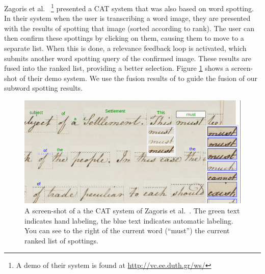 \documentclass[ms,electronic,twosidetoc,letterpaper,chaptercenter,parttop,lol,lof,lot]{byumsphd}
\begin{document}
Zagoris et al.~\cite{Zagoris2015} \footnote{A demo of their system is found at \url{http://vc.ee.duth.gr/ws/}} presented a CAT system that was also based on word spotting. In their system when the user is transcribing a word image, they are presented with the results of spotting that image (sorted according to rank). The user can then confirm these spottings by clicking on them, causing them to move to a separate list. When this is done, a relevance feedback loop is activated, which submits another word spotting query of the confirmed image. These results are fused into the ranked list, providing a better selection. Figure \ref{fig:zagoris} shows a screen-shot of their demo system.
We use the fusion results of \cite{Zagoris2015} to guide the fusion of our subword spotting results.

\begin{figure}
    \centering
    \includegraphics[width=.9\textwidth]{zagoris}
    \caption{A screen-shot of a the CAT system of Zagoris et al.~\cite{Zagoris2015}. The green text indicates hand labeling, the blue text indicates automatic labeling. You can see to the right of the current word (``must'') the current ranked list of spottings.}
    \label{fig:zagoris}
\end{figure}
\end{document}
